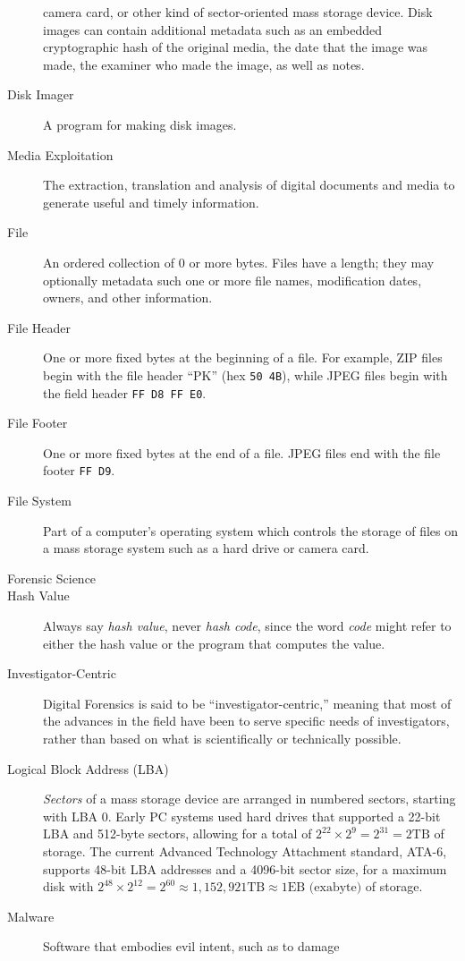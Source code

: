 \begin{description}
  camera card, or other kind of sector-oriented mass storage
  device. Disk images can contain additional metadata such as an
  embedded cryptographic hash of the original media, the date that the
  image was made, the examiner who made the image, as well as notes.
\item[Disk Imager] A program for making disk images.
\item[Media Exploitation] The extraction, translation and
  analysis of digital documents and media to generate
  useful and timely information.
\item[File] An ordered collection of 0 or more bytes. Files have a
  length; they may optionally metadata such one or more file names,
  modification dates, owners, and other information.
\item[File Header] One or more fixed bytes at the beginning of a
  file. For example, ZIP files begin with the file header ``PK'' (hex
  \texttt{50 4B}), while JPEG files begin with the field header
  \texttt{FF D8 FF E0}.
\item[File Footer] One or more fixed bytes at the end of a file. JPEG
  files end with the file footer \texttt{FF D9}.
\item[File System] Part of a computer's operating system which
  controls the storage of files on a mass storage system such as a
  hard drive or camera card.
\item[Forensic Science]
\item[Hash Value] Always say \emph{hash value}, never \emph{hash
  code}, since the word \emph{code} might refer to either the hash
  value or the program that computes the value.
\item[Investigator-Centric] Digital Forensics is said to be
  ``investigator-centric,'' meaning that most of the advances in the
  field have been to serve specific needs of investigators, rather
  than based on what is scientifically or technically possible.
\item[Logical Block Address (LBA)] \emph{Sectors} of a mass storage
  device are arranged in numbered sectors, starting with LBA 0. Early
  PC systems used hard drives that supported a 22-bit LBA and 512-byte sectors, allowing for a
  total of $2^{22}\times 2^{9}=2^{31}=2\textrm{TB}$ of storage. The
  current Advanced Technology Attachment standard, ATA-6, supports
  48-bit LBA addresses and a 4096-bit sector size, for a maximum disk
  with $2^{48}\times 2^{12}=2^{60}\approx 1,152,921\textrm{TB} \approx 1
  \textrm{EB (exabyte)}$ of storage.
\item[Malware] Software that embodies evil intent, such as to damage

\end{description}
